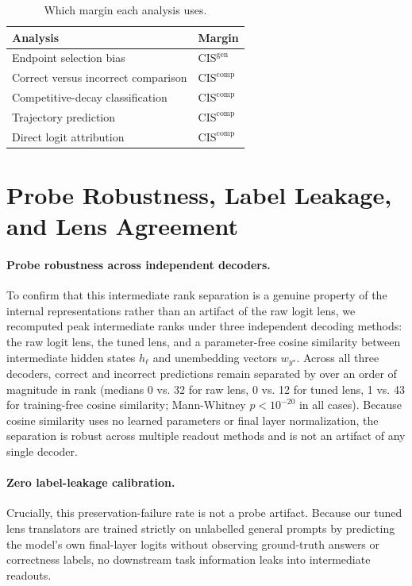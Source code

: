 \documentclass{article} %
\begin{document}
\begin{table}[h]
\centering
\caption{Which margin each analysis uses.}
\label{tab:metric}
\begin{tabular}{ll}
\toprule
\textbf{Analysis} & \textbf{Margin} \\
\midrule
Endpoint selection bias & $\mathrm{CIS}^{\mathrm{gen}}$ \\
Correct versus incorrect comparison & $\mathrm{CIS}^{\mathrm{comp}}$ \\
Competitive-decay classification & $\mathrm{CIS}^{\mathrm{comp}}$ \\
Trajectory prediction & $\mathrm{CIS}^{\mathrm{comp}}$ \\
Direct logit attribution & $\mathrm{CIS}^{\mathrm{comp}}$ \\
\bottomrule
\end{tabular}
\end{table}

\section{Probe Robustness, Label Leakage, and Lens Agreement}
\label{app:probe}

\paragraph{Probe robustness across independent decoders.}
To confirm that this intermediate rank separation is a genuine property of the internal representations rather than an artifact of the raw logit lens, we recomputed peak intermediate ranks under three independent decoding methods: the raw logit lens, the tuned lens, and a parameter-free cosine similarity between intermediate hidden states $h_\ell$ and unembedding vectors $w_{y^\star}$. Across all three decoders, correct and incorrect predictions remain separated by over an order of magnitude in rank (medians 0 vs. 32 for raw lens, 0 vs. 12 for tuned lens, 1 vs. 43 for training-free cosine similarity; Mann-Whitney $p < 10^{-20}$ in all cases). Because cosine similarity uses no learned parameters or final layer normalization, the separation is robust across multiple readout methods and is not an artifact of any single decoder.

\paragraph{Zero label-leakage calibration.}
Crucially, this preservation-failure rate is not a probe artifact. Because our tuned lens translators are trained strictly on unlabelled general prompts by predicting the model's own final-layer logits without observing ground-truth answers or correctness labels, no downstream task information leaks into intermediate readouts.
\end{document}
